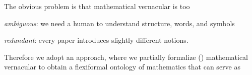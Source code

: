 The obvious problem is that mathematical vernacular is too 
\begin{inparaenum}[\em i\rm)]
\item \emph{ambiguous}: we need a human to understand structure, words, and symbols
\item \emph{redundant}: every paper introduces slightly different notions. 
\end{inparaenum}
Therefore we adopt an approach, where we partially formalize ()
mathematical vernacular to obtain a flexiformal ontology of mathematics that can serve as


